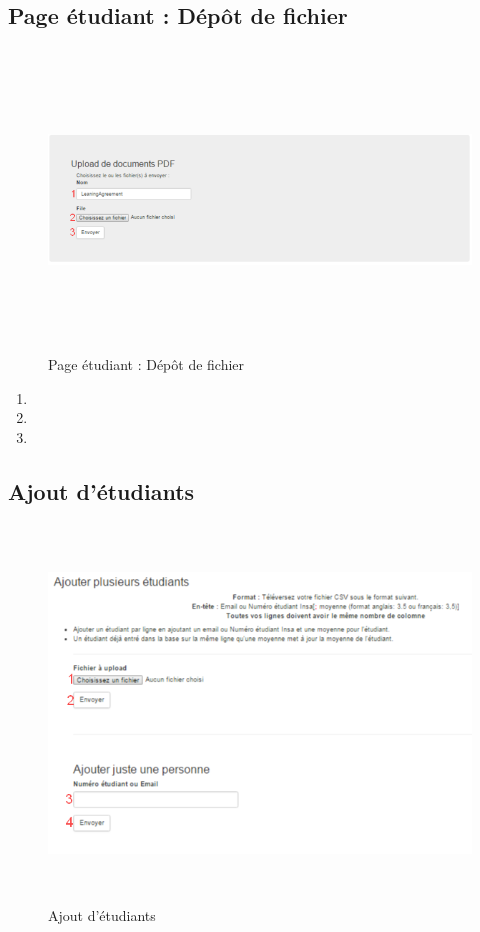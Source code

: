           \subsection{Page étudiant : Dépôt de fichier}
          \label{ef}
          \begin{figure}[H]
          	\centering
          	\includegraphics[width=12cm,height=8cm]{Images/Admin/ajout_fichier_admin.png}
          	\caption{Page étudiant : Dépôt de fichier}
          	
          \end{figure}
           \begin{enumerate}
           	\item
           	\item
           	\item
           \end{enumerate}
          
          \subsection{Ajout d'étudiants}
          \label{aet}
          \begin{figure}[H]
          	\centering
          	\includegraphics[width=14cm,height=10cm]{Images/Admin/ajout_etud_admin.png}
          	\caption{Ajout d'étudiants}
          	
          \end{figure}
               
